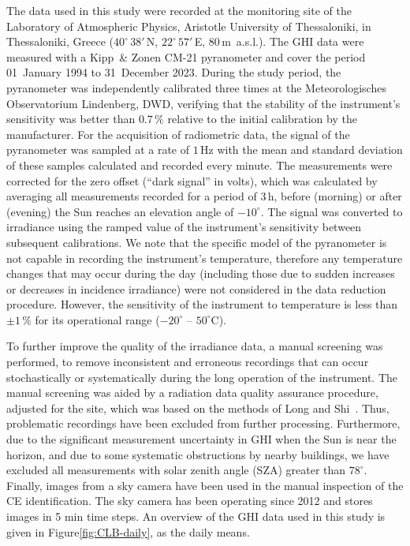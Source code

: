 \documentclass[preprint, 5p,
authoryear]{elsarticle} %
\begin{document}
The data used in this study were recorded at the monitoring site of the
Laboratory of Atmospheric Physics, Aristotle University of Thessaloniki,
in Thessaloniki, Greece (\(40^\circ\,38'\,\)N, \(22^\circ\,57'\,\)E,
\(80\,\)m~a.s.l.). The GHI data were measured with a Kipp~\& Zonen CM-21
pyranometer and cover the period 01~January 1994 to 31~December 2023.
During the study period, the pyranometer was independently calibrated
three times at the Meteorologisches Observatorium Lindenberg, DWD,
verifying that the stability of the instrument's sensitivity was better
than \(0.7\,\%\) relative to the initial calibration by the
manufacturer. For the acquisition of radiometric data, the signal of the
pyranometer was sampled at a rate of \(1\,\text{Hz}\) with the mean and
standard deviation of these samples calculated and recorded every
minute. The measurements were corrected for the zero offset (``dark
signal'' in volts), which was calculated by averaging all measurements
recorded for a period of \(3\,\text{h}\), before (morning) or after
(evening) the Sun reaches an elevation angle of \(-10^\circ\). The
signal was converted to irradiance using the ramped value of the
instrument's sensitivity between subsequent calibrations. We note that
the specific model of the pyranometer is not capable in recording the
instrument's temperature, therefore any temperature changes that may
occur during the day (including those due to sudden increases or
decreases in incidence irradiance) were not considered in the data
reduction procedure. However, the sensitivity of the instrument to
temperature is less than \(\pm1\,\%\) for its operational range
(\(-20^\circ\) -- \(50^\circ\)C).

To further improve the quality of the irradiance data, a manual
screening was performed, to remove inconsistent and erroneous recordings
that can occur stochastically or systematically during the long
operation of the instrument. The manual screening was aided by a
radiation data quality assurance procedure, adjusted for the site, which
was based on the methods of Long and Shi~\citep{Long2006, Long2008a}.
Thus, problematic recordings have been excluded from further processing.
Furthermore, due to the significant measurement uncertainty in GHI when
the Sun is near the horizon, and due to some systematic obstructions by
nearby buildings, we have excluded all measurements with solar zenith
angle (SZA) greater than \(78^\circ\). Finally, images from a sky camera
have been used in the manual inspection of the CE identification. The
sky camera has been operating since 2012 and stores images in 5 min time
steps. An overview of the GHI data used in this study is given in
Figure\nobreakspace{}\ref{fig:CLB-daily}, as the daily means.
\end{document}
